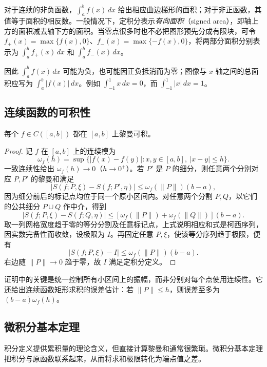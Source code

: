 \documentclass[UTF8,12pt,a4paper,fontset=fandol]{ctexbook}
\begin{document}
对于连续的非负函数，$\int_a^b f(x)\,dx$ 给出相应曲边梯形的面积；对于非正函数，其值等于面积的相反数。一般情况下，定积分表示\emph{有向面积}（signed area），即轴上方的面积减去轴下方的面积。当零点很多时也不必把图形预先分成有限块，可令 $f_+(x)=\max\{f(x),0\}$、$f_-(x)=\max\{-f(x),0\}$，将两部分面积分别表示为 $\int_a^b f_+(x)\,dx$ 和 $\int_a^b f_-(x)\,dx$。

因此 $\int_a^b f(x)\,dx$ 可能为负，也可能因正负抵消而为零；图像与 $x$ 轴之间的总面积应写为 $\int_a^b|f(x)|\,dx$。例如 $\int_{-1}^1x\,dx=0$，而 $\int_{-1}^1|x|\,dx=1$。

\subsection{连续函数的可积性}
\label{subsec:integrability-of-continuous-functions}

\begin{theorem}
\label{thm:continuous-functions-riemann-integrable}
每个 $f\in C([a,b])$ 都在 $[a,b]$ 上黎曼可积。
\end{theorem}
\begin{proof}
记 $f$ 在 $[a,b]$ 上的连续模为
\[
    \omega_f(h)=\sup\{|f(x)-f(y)|:x,y\in[a,b],\ |x-y|\leq h\}.
\]
一致连续性给出 $\omega_f(h)\to0$（$h\to0^+$）。若 $P'$ 是 $P$ 的细分，则任意两个分别对应 $P,P'$ 的黎曼和满足
\[
    |S(f;P,\xi)-S(f;P',\eta)|
    \leq\omega_f(\|P\|)(b-a),
\]
因为细分前后的标记点均位于同一个原小区间内。对任意两个分割 $P,Q$，以它们的公共细分 $P\cup Q$ 作中介，得到
\[
    |S(f;P,\xi)-S(f;Q,\eta)|
    \leq[\omega_f(\|P\|)+\omega_f(\|Q\|)](b-a).
\]
取一列网格宽度趋于零的等分分割及任意标记点，上式说明相应和式是柯西序列，因实数完备性而收敛，设极限为 $I$。再固定任意 $P,\xi$，使该等分序列趋于极限，便有
\[
    |S(f;P,\xi)-I|\leq\omega_f(\|P\|)(b-a).
\]
右边随 $\|P\|\to0$ 趋于零，故 $I$ 满足定积分定义。
\end{proof}

证明中的关键是统一控制所有小区间上的振幅，而非分别对每个点使用连续性。它还给出连续函数矩形求积的误差估计：若 $\|P\|\leq h$，则误差至多为 $(b-a)\omega_f(h)$。

\subsection{微积分基本定理}
\label{subsec:fundamental-theorem-of-calculus}

积分定义提供累积量的理论含义，但直接计算黎曼和通常很繁琐。微积分基本定理把积分与原函数联系起来，从而将求和极限转化为端点值之差。
\end{document}
